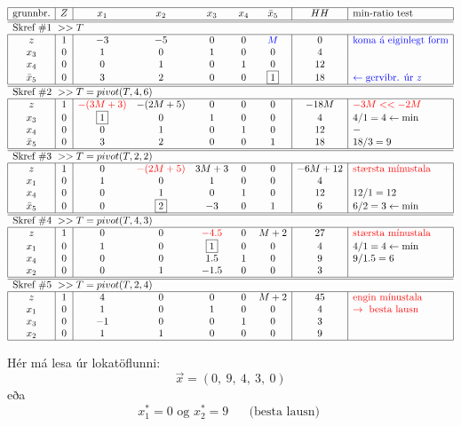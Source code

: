 \begin{lausn}
\begin{center}
{\renewcommand{\arraystretch}{1.5} \renewcommand{\tabcolsep}{0.2cm}
{\scriptsize
$\begin{array}{|c|c|ccccc|c|l|} \hline 
\textrm{grunnbr.} &  Z &  x_1 &  x_2 &   x_3 &  x_4 &  \bar{x}_5 &  HH   & \textrm{min-ratio test}\\ 
\hline\hline \multicolumn{7}{l}{\textrm{Skref \#1 } >> T } \\ \hline
z   & 1 &-3 &-5 & 0 & 0 & \color{blue}{M} & 0 & \color{blue}{\textrm{koma á eiginlegt form}}\\
x_3 & 0 & 1 & 0 & 1 & 0 & 0 & 4 & \\
x_4 & 0 & 0 & 1 & 0 & 1 & 0 & 12 & \\
\bar{x}_5 & 0 & 3 & 2 & 0 & 0 & \fbox{1} & 18 & \color{blue}{\leftarrow \textrm{gervibr. úr }z}\\ \hline
\hline \multicolumn{7}{l}{\textrm{Skref \#2 } >> T=pivot(T,4,6) } \\ \hline
z   & 1 & \color{red}{-(3M+3)} & -(2M+5) & 0 & 0 & 0 & -18M & \color{red}{-3M << -2M}\\
x_3 & 0 & \fbox{1} & 0 & 1 & 0 & 0 & 4 & 4/1=4 \leftarrow \min \\ 
x_4 & 0 & 0 & 1 & 0 & 1 & 0 & 12 & -\\
\bar{x}_5 & 0 & 3 & 2 & 0 & 0 & 1 & 18 & 18/3=9\\ \hline
\hline \multicolumn{7}{l}{\textrm{Skref \#3 } >> T=pivot(T,2,2) } \\ \hline
z   & 1 & 0 & \color{red}{-(2M+5)} & 3M+3 & 0 & 0 & -6M+12 & \color{red}{\textrm{stærsta mínustala}}\\
x_1 & 0 & 1 & 0 & 1 & 0 & 0 & 4 &\\
x_4 & 0 & 0 & 1 & 0 & 1 & 0 & 12 & 12/1=12\\
\bar{x}_5 & 0 & 0 & \fbox{2} & -3 & 0 & 1 & 6 & 6/2=3\leftarrow \min\\ \hline
\hline \multicolumn{7}{l}{\textrm{Skref \#4 } >> T=pivot(T,4,3) } \\ \hline
z   & 1 & 0 & 0 &\color{red}{-4.5} & 0 & M+2 & 27 &\color{red}{\textrm{stærsta mínustala}}\\
x_1 & 0 & 1 & 0 & \fbox{1} & 0 & 0 & 4 & 4/1=4\leftarrow\min \\ 
x_4 & 0 & 0 & 0 & 1.5 & 1 & 0 & 9 & 9/1.5=6\\ 
x_2 & 0 & 0 & 1 &-1.5 & 0 & 0 & 3 &\\ \hline
\hline \multicolumn{7}{l}{\textrm{Skref \#5 } >> T=pivot(T,2,4)}\\ \hline
z   & 1 & 4 & 0 & 0 & 0 & M+2 & 45 & \color{red}{\textrm{engin mínustala}}\\
x_1 & 0 & 1 & 0 & 1 & 0 & 0 & 4 & \color{red}{\rightarrow \textrm{ besta lausn}}\\
x_3 & 0 &-1 & 0 & 0 & 1 & 0 & 3 &\\
x_2 & 0 & 1 & 1 & 0 & 0 & 0 & 9 &\\ \hline
\end{array}$}}
\end{center}
Hér má lesa úr lokatöflunni:
$$\vec{x} = (0,~ 9,~ 4,~ 3,~ 0)$$
eða
$$x_1^* = 0 \mbox{ og } x_2^* = 9 \mbox{~~~~~(besta lausn) }$$


\end{lausn}
